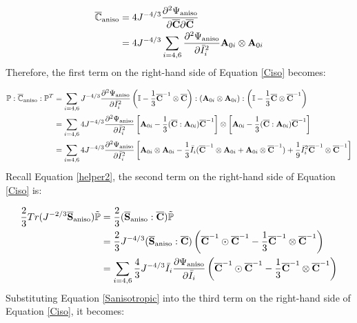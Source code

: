 \begin{equation}
\begin{split}
\overline{\mathbb{C}}_\mathrm{aniso} 
&= 4J^{-4/3}\frac{\partial^2\Psi_\mathrm{aniso}}{\partial\overline{\bold{C}}\partial\overline{\bold{C}}} \\
&= 4J^{-4/3}\sum_{i = 4, 6}\frac{\partial^2\Psi_\mathrm{aniso}}{\partial{\bar{I}_i}^2}\bold{A}_{0i} \otimes \bold{A}_{0i}
\end{split}
\end{equation}
Therefore, the first term on the right-hand side of Equation \ref{Ciso} becomes:

\begin{equation} \label{part13}
\begin{split}
\mathbb{P} : \overline{\mathbb{C}}_\mathrm{aniso} : \mathbb{P}^T 
&= \sum_{i = 4, 6}J^{-4/3}\frac{\partial^2\Psi_\mathrm{aniso}}{\partial{\bar{I}_i}^2} \left( \mathbb{I} - \frac{1}{3}\overline{\bold{C}}^{-1} \otimes \overline{\bold{C}} \right):(\bold{A}_{0i} \otimes \bold{A}_{0i}):\left( \mathbb{I} - \frac{1}{3}\overline{\bold{C}} \otimes \overline{\bold{C}}^{-1} \right) \\
&= \sum_{i = 4, 6} 4J^{-4/3}\frac{\partial^2\Psi_\mathrm{aniso}}{\partial{\bar{I}_i}^2}
\left[ \bold{A}_{0i} - \frac{1}{3}(\overline{\bold{C}} : \bold{A}_{0i})\overline{\bold{C}}^{-1} \right] \otimes
\left[ \bold{A}_{0i} - \frac{1}{3}(\overline{\bold{C}} : \bold{A}_{0i})\overline{\bold{C}}^{-1} \right] \\
&= \sum_{i = 4, 6} 4J^{-4/3}\frac{\partial^2\Psi_\mathrm{aniso}}{\partial{\bar{I}_i}^2}
\left[ \bold{A}_{0i} \otimes \bold{A}_{0i} - \frac{1}{3}\bar{I}_i
(\overline{\bold{C}}^{-1} \otimes \bold{A}_{0i} + \bold{A}_{0i} \otimes \overline{\bold{C}}^{-1}) 
+ \frac{1}{9}\bar{I}_i^2 \overline{\bold{C}}^{-1} \otimes \overline{\bold{C}}^{-1} \right]
\end{split}
\end{equation}
Recall Equation \ref{helper2}, the second term on the right-hand side of Equation \ref{Ciso} is:

\begin{equation} \label{part23}
\begin{split}
\frac{2}{3}Tr(J^{-2/3}\overline{\bold{S}}_\mathrm{aniso})\tilde{\mathbb{P}} &= \frac{2}{3}(\overline{\bold{S}}_\mathrm{aniso} : \overline{\bold{C}}) \tilde{\mathbb{P}} \\
&= \frac{2}{3}J^{-4/3}(\overline{\bold{S}}_\mathrm{aniso} : \overline{\bold{C}}) 
\left( \overline{\bold{C}}^{-1} \odot \overline{\bold{C}}^{-1} - \frac{1}{3}\overline{\bold{C}}^{-1}\otimes\overline{\bold{C}}^{-1} \right) \\
&= \sum_{i = 4, 6}\frac{4}{3}J^{-4/3}\bar{I}_i\frac{\partial{\Psi_\mathrm{aniso}}}{\partial\bar{I}_i}
\left( \overline{\bold{C}}^{-1} \odot \overline{\bold{C}}^{-1} - \frac{1}{3}\overline{\bold{C}}^{-1}\otimes\overline{\bold{C}}^{-1} \right) \\
\end{split}
\end{equation}
Substituting Equation \ref{Sanisotropic} into the third term on the right-hand side of Equation \ref{Ciso}, it becomes:

